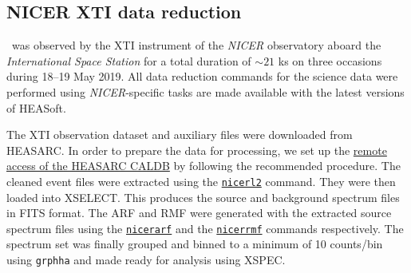     \subsection{NICER XTI data reduction}
    	\source\ was observed by the XTI instrument of the \textit{NICER} observatory aboard the \textit{International Space Station} for a total duration of $\sim 21$ ks on three occasions during 18--19 May 2019. All data reduction commands for the science data were performed using \textit{NICER}-specific tasks are made available with the latest versions of %
    	HEASoft.
    	
    	The XTI observation dataset and auxiliary files were downloaded from HEASARC. In order to prepare the data for processing, we set up the %
    	\href{https://heasarc.gsfc.nasa.gov/docs/heasarc/caldb/caldb_remote_access.html}{remote access of the HEASARC CALDB} by following the recommended %
    	procedure. The cleaned event files were extracted using the %
    	\href{https://heasarc.gsfc.nasa.gov/lheasoft/ftools/headas/nicerl2.html}{\texttt{nicerl2}} command. They were then loaded into XSELECT. This produces the source and background spectrum files in FITS format. The ARF and RMF were generated with the extracted source spectrum files using the %
    	\href{https://heasarc.gsfc.nasa.gov/lheasoft/ftools/headas/nicerarf.html}{\texttt{nicerarf}} and the %
    	\href{https://heasarc.gsfc.nasa.gov/lheasoft/ftools/headas/nicerrmf.html}{\texttt{nicerrmf}} commands respectively. The spectrum set was finally grouped and binned to a minimum of 10 counts/bin using \texttt{grphha} and made ready for analysis using XSPEC.